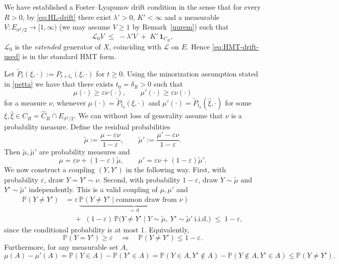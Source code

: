 \documentclass[11pt, a4paper,leqno]{amsart}
\theoremstyle{definition}
\numberwithin{equation}{section}
\begin{document}
We have established a  Foster–Lyapunov drift condition in the sense that for every $R>0$, by \eqref{eq:HL-drift} there exist $\lambda'>0$, $K'<\infty$ and a measurable $V:E_{\sigma^2/2}\to[1,\infty)$ (we may assume $V\ge1$ by Remark~\ref{uurem}) such that
\begin{equation}\label{eq:HMT-drift-used}
\mathcal{L}_0V \;\le\; -\lambda' V \;+\; K'\,\mathbf 1_{C_R},
\end{equation}
 $\mathcal L_0$ is the \emph{extended} generator of $X$,  coinciding with $\mathcal L$ on $E$. Hence \eqref{eq:HMT-drift-used} is in the standard HMT form.

 Let $\tilde P_{t}(\xi,\cdot):=P_{t+t_\ast}(\xi,\cdot)$ for $t\geq 0$. Using the minorization assumption stated in  \eqref{petta} we have that there exists $t_0=\delta_R>0$ such that
\begin{equation}\label{alla+}
\mu(\cdot) \ge \varepsilon \nu(\cdot), \qquad \mu'(\cdot) \ge \varepsilon \nu(\cdot)
\end{equation}
for a measure $\nu$, whenever  \( \mu(\cdot) = \tilde P_{t_0}(\xi,\cdot) \) and \( \mu'(\cdot) = \tilde P_{t_0}(\hat \xi,\cdot) \) for some $\xi,\hat\xi\in C_R=\hat C_R\cap E_{\sigma^2/2}$. We can without loss of generality assume that $\nu$ is a probability measure.  Define the residual probabilities
\[
\tilde\mu := \frac{\mu - \varepsilon \nu}{1 - \varepsilon},
\qquad
\tilde\mu' := \frac{\mu' - \varepsilon \nu}{1 - \varepsilon}.
\]
Then \( \tilde\mu, \tilde\mu' \) are probability measures and
\[
\mu = \varepsilon \nu + (1 - \varepsilon)\tilde\mu,
\qquad
\mu' = \varepsilon \nu + (1 - \varepsilon)\tilde\mu'.
\]
We now construct a coupling \( (Y,Y') \) in the following way. First, with probability \( \varepsilon \), draw \( Y = Y' \sim \nu \). Second,  with probability \( 1 - \varepsilon \), draw \( Y \sim \tilde\mu \) and \( Y' \sim \tilde\mu' \) independently.
This is a valid coupling of \( \mu, \mu' \) and
\begin{align*}
\mathbb P(Y\neq Y')
&= \varepsilon\,\underbrace{\mathbb P(Y\neq Y'\mid \text{common draw from }\nu)}_{=\,0}\\
&\quad \;+\;
(1-\varepsilon)\,\mathbb P\bigl(Y\neq Y'\mid Y\sim\tilde\mu,\ Y'\sim\tilde\mu'\ \text{i.i.d.}\bigr)
\;\le\; 1-\varepsilon,
\end{align*}
since the conditional probability is at most $1$. Equivalently,
\[
\mathbb P(Y=Y') \ge \varepsilon
\quad\Rightarrow\quad
\mathbb P(Y\neq Y') \le 1-\varepsilon.\] Furthermore,  for any measurable set $A$,
\[
\mu(A)-\mu'(A)
= \mathbb P(Y\in A)-\mathbb P(Y'\in A)
= \mathbb P(Y\in A, Y'\notin A)-\mathbb P(Y\notin A, Y'\in A)
\le \mathbb P(Y\neq Y').
\]
\end{document}

